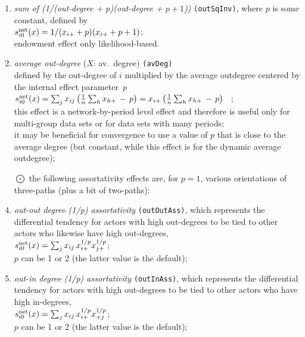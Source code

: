 \documentclass[a4paper,fleqn,11pt]{article}
\newcommand{\+}{\, + \,}
\newcommand{\vit}{\theenumi}
\begin{document}
\begin{enumerate}
 \item {\em sum of (1/(out-degree + $p$)(out-degree + $p+1$))} \texttt{(outSqInv)},
 where $p$ is some constant, defined by  \\
 $s^{\rm net}_{i\vit}(x) = 1/(x_{i+} + p)(x_{i+} + p + 1)$;\\
 endowment effect only likelihood-based.

 \item {\em average out-degree} ($X$: av.\ degree) \texttt{(avDeg)}\\
 defined by the out-degree of $i$ multiplied by the
 average outdegree centered by the internal effect parameter~$p$\\[0.2em]
 $s^{\rm net}_{i\vit}(x) =  \sum_j x_{ij}\, \big( \frac 1n \sum_h  {x_{h+}} \,-\, p \big)=
                           x_{i+}\, \big( \frac 1n \sum_h x_{h+} \,-\, p \big) $ \, ;\\[0.2em]
  this effect is a network-by-period level effect and therefore is useful only
  for \\
  multi-group data sets or for data sets with many periods;\\
  it may be beneficial for convergence to use a value of $p$ that is
  close to the average degree (but constant, while this effect
  is for the dynamic average outdegree);

 \item[{\hspace*{-1ex}$\bigodot$}] the following assortativity effects are,
 for $p=1$, various orientations of three-paths (plus a bit of two-paths):\\

 \item {\em out-out degree$\,\hat{\ }$(1/p) assortativity}
 \texttt{(outOutAss)},
 which represents the differential tendency for actors with high out-degrees
 to be tied to other actors who likewise have high out-degrees,\\
 $s^{\rm net}_{i\vit}(x) = \sum_j x_{ij}\, {x_{i+}^{1/p}} {x_{j+}^{1/p}} $;\\
 $p$ can be 1 or 2 (the latter value is the default);

 \item {\em out-in degree$\,\hat{\ }$(1/p) assortativity}
 \texttt{(outInAss)},
 which represents the differential tendency for actors with high out-degrees
 to be tied to other actors who have high in-degrees,\\
 $s^{\rm net}_{i\vit}(x) = \sum_j x_{ij}\, {x_{i+}^{1/p}} {x_{+j}^{1/p}} $;\\
 $p$ can be 1 or 2 (the latter value is the default);


\end{enumerate}
\end{document}
